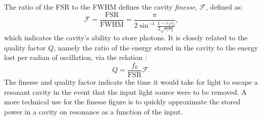 The ratio of the \gls{FSR} to the \gls{FWHM} defines the cavity \emph{finesse}, $\mathcal{F}$, defined as:
\begin{equation}
  \mathcal{F} = \frac{\text{FSR}}{\text{FWHM}} = \frac{\pi}{2 \sin^{-1}{\frac{1 - r_1 r_2}{2 \sqrt{r_1 r_2}}}},
\end{equation}
which indicates the cavity's ability to store photons. It is closely related to the quality factor $Q$, namely the ratio of the energy stored in the cavity to the energy lost per radian of oscillation, via the relation \cite{Band2006}:
\begin{equation}
Q = \frac{f_0}{\text{FSR}} \mathcal{F}.
\end{equation}
The finesse and quality factor indicate the time it would take for light to escape a resonant cavity in the event that the input light source were to be removed. A more technical use for the finesse figure is to quickly approximate the stored power in a cavity on resonance as a function of the input. 

